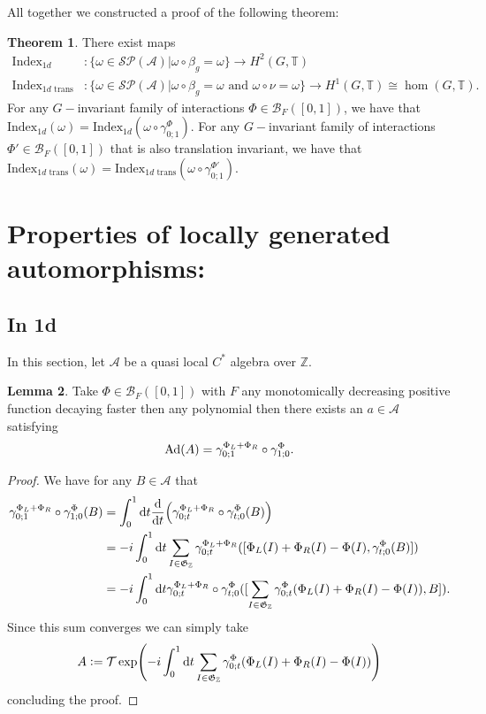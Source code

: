 \documentclass[12pt,a4paper,twoside]{article}
\renewcommand{\d}{\text{d}}
\newcommand{\defeq}{\vcentcolon=}
\let\originalleft\left
\let\originalright\right
\renewcommand{\left}{\mathopen{}\mathclose\bgroup\originalleft}
\renewcommand{\right}{\aftergroup\egroup\originalright}
\newcommand{\BB}{\mathcal B}
\newcommand{\PP}{\mathcal P}
\newcommand{\ZZ}{\mathbb Z}
\newcommand{\TT}{\mathbb T}
\renewcommand{\AA}{\mathcal A}
\newcommand{\Ad}[1]{\textrm{Ad}\left(#1\right)}
\theoremstyle{definition}
\newtheorem{theorem}{Theorem}[section]
\newtheorem{lemma}[theorem]{Lemma}
\numberwithin{equation}{section}
\begin{document}
All together we constructed a proof of the following theorem:
\begin{theorem}
	There exist maps
	\begin{align}
		\textrm{Index}_{1d}&:\{\omega\in\mathcal{S}\PP(\AA)|\omega\circ\beta_g=\omega\}\rightarrow H^2(G,\TT)\\
		\textrm{Index}_{1d\text{ trans}}&:\{\omega\in\mathcal{S}\PP(\AA)|\omega\circ\beta_g=\omega\text{ and }\omega\circ\nu=\omega\}\rightarrow H^1(G,\TT)\cong \hom(G,\TT).
	\end{align}
	For any $G-$invariant family of interactions $\Phi\in\BB_{F}([0,1])$, we have that $\textrm{Index}_{1d}(\omega)=\textrm{Index}_{1d}(\omega\circ\gamma^\Phi_{0;1})$. For any $G-$invariant family of interactions $\Phi'\in\BB_{F}([0,1])$ that is also translation invariant, we have that $\textrm{Index}_{1d\text{ trans}}(\omega)=\textrm{Index}_{1d\text{ trans}}(\omega\circ\gamma^{\Phi'}_{0;1})$.
\end{theorem}
\section{Properties of locally generated automorphisms:}
\subsection{In 1d}
In this section, let $\AA$ be a quasi local $C^*$ algebra over $\ZZ$.
\begin{lemma}\label{lem:PropertiesLocallyGeneratedAutomorphisms1d}
	Take $\Phi\in\BB_{F}([0,1])$ with $F$ any monotomically decreasing positive function decaying faster then any polynomial then there exists an $a\in\AA$ satisfying
	\begin{equation}
		\Ad{A}=\gamma^{\Phi_L+\Phi_R}_{0;1}\circ\gamma^\Phi_{1;0}.
	\end{equation}
\end{lemma}
\begin{proof}
	We have for any $B\in\AA$ that
	\begin{align}
		\gamma^{\Phi_L+\Phi_R}_{0;1}\circ\gamma^\Phi_{1;0}(B)&=\int_{0}^{1}\d t\frac{\d}{\d t}\left(\gamma^{\Phi_L+\Phi_R}_{0;t}\circ\gamma^\Phi_{t;0}(B)\right)\\
		&=-i\int_{0}^{1}\d t\sum_{I\in\mathfrak{G}_\ZZ}\gamma^{\Phi_L+\Phi_R}_{0;t}([\Phi_L(I)+\Phi_R(I)-\Phi(I),\gamma^{\Phi}_{t;0}(B)])\\
		&=-i\int_{0}^{1}\d t\gamma^{\Phi_L+\Phi_R}_{0;t}\circ\gamma^{\Phi}_{t;0}([\sum_{I\in\mathfrak{G}_\ZZ}\gamma^{\Phi}_{0;t}(\Phi_L(I)+\Phi_R(I)-\Phi(I)),B]).
	\end{align}
	Since this sum converges we can simply take
	\begin{equation}
		A\defeq\mathcal{T}\exp(-i\int_{0}^{1}\d t \sum_{I\in\mathfrak{G}_\ZZ}\gamma^{\Phi}_{0;t}(\Phi_L(I)+\Phi_R(I)-\Phi(I)))
	\end{equation}
	concluding the proof.
\end{proof}
\end{document}
